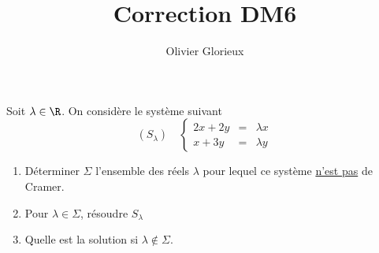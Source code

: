 \documentclass[a4paper, 11pt,reqno]{article}
\author{Olivier Glorieux}
\begin{document}
\title{Correction DM6 
}






\begin{exercice}
Soit $\lambda \in \R$. On considère le système suivant 
$$(S_\lambda)\quad  \left\{ \begin{array}{ccc}
2x +2y & =& \lambda x\\
x +3y  & =& \lambda y 
\end{array}\right. $$

\begin{enumerate}
\item Déterminer $\Sigma$ l'ensemble des réels $\lambda$ pour lequel ce système \underline{n'est pas} de Cramer. 
\item Pour $\lambda \in \Sigma$, résoudre $S_\lambda$
\item Quelle est la solution si $\lambda \notin \Sigma$. 
\end{enumerate}
\end{exercice}
\end{document}
